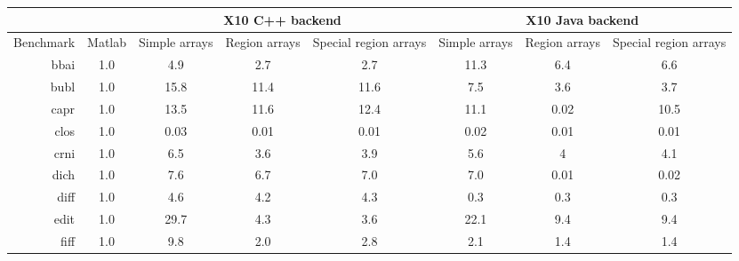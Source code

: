 \begin{tabular}{|r|c|ccc|ccc|}
\hline
           &        & \multicolumn{3}{c|}{X10 C++ backend}                   &
\multicolumn{3}{c|}{X10 Java backend}                  \\ \hline
Benchmark  & Matlab & Simple arrays & Region arrays & Special region arrays &
Simple arrays & Region arrays & Special region arrays \\ \hline
bbai           & 1.0     & 4.9                    & 2.7                     & 2.7                             & 11.3                         & 6.4                      & 6.6                              \\
bubl           & 1.0     & 15.8                   & 11.4                    & 11.6                            & 7.5                          & 3.6                      & 3.7                              \\
capr           & 1.0     & 13.5                   & 11.6                    & 12.4                            & 11.1                         & 0.02                        & 10.5                             \\
clos           & 1.0     & 0.03                   & 0.01                    & 0.01                               & 0.02                         & 0.01                     & 0.01                             \\
crni           & 1.0     & 6.5                    & 3.6                     & 3.9                             & 5.6                          & 4                        & 4.1                              \\
dich           & 1.0     & 7.6                    & 6.7                     & 7.0                               & 7.0                            & 0.01                        & 0.02                                \\
diff           & 1.0     & 4.6                    & 4.2                     & 4.3                             & 0.3                          & 0.3                      & 0.3                              \\
edit           & 1.0     & 29.7                   & 4.3                     & 3.6                             & 22.1                         & 9.4                      & 9.4                              \\
fiff           & 1.0     & 9.8                    & 2.0                       & 2.8                             & 2.1                          & 1.4                      & 1.4                              \\

\end{tabular}
